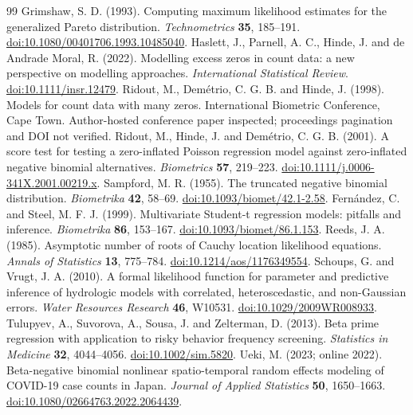 \documentclass[12pt]{article}
\theoremstyle{definition}
\theoremstyle{remark}
\begin{document}
\begin{thebibliography}{99}
 Grimshaw, S. D. (1993). Computing maximum likelihood estimates for the generalized Pareto distribution. \textit{Technometrics} \textbf{35}, 185--191. \href{https://doi.org/10.1080/00401706.1993.10485040}{doi:10.1080/00401706.1993.10485040}.
 Haslett, J., Parnell, A. C., Hinde, J. and de Andrade Moral, R. (2022). Modelling excess zeros in count data: a new perspective on modelling approaches. \textit{International Statistical Review}. \href{https://doi.org/10.1111/insr.12479}{doi:10.1111/insr.12479}.
 Ridout, M., Dem\'etrio, C. G. B. and Hinde, J. (1998). Models for count data with many zeros. International Biometric Conference, Cape Town. Author-hosted conference paper inspected; proceedings pagination and DOI not verified.
 Ridout, M., Hinde, J. and Dem\'etrio, C. G. B. (2001). A score test for testing a zero-inflated Poisson regression model against zero-inflated negative binomial alternatives. \textit{Biometrics} \textbf{57}, 219--223. \href{https://doi.org/10.1111/j.0006-341X.2001.00219.x}{doi:10.1111/j.0006-341X.2001.00219.x}.
 Sampford, M. R. (1955). The truncated negative binomial distribution. \textit{Biometrika} \textbf{42}, 58--69. \href{https://doi.org/10.1093/biomet/42.1-2.58}{doi:10.1093/biomet/42.1-2.58}.
 Fern\'andez, C. and Steel, M. F. J. (1999). Multivariate Student-t regression models: pitfalls and inference. \textit{Biometrika} \textbf{86}, 153--167. \href{https://doi.org/10.1093/biomet/86.1.153}{doi:10.1093/biomet/86.1.153}.
 Reeds, J. A. (1985). Asymptotic number of roots of Cauchy location likelihood equations. \textit{Annals of Statistics} \textbf{13}, 775--784. \href{https://doi.org/10.1214/aos/1176349554}{doi:10.1214/aos/1176349554}.
 Schoups, G. and Vrugt, J. A. (2010). A formal likelihood function for parameter and predictive inference of hydrologic models with correlated, heteroscedastic, and non-Gaussian errors. \textit{Water Resources Research} \textbf{46}, W10531. \href{https://doi.org/10.1029/2009WR008933}{doi:10.1029/2009WR008933}.
 Tulupyev, A., Suvorova, A., Sousa, J. and Zelterman, D. (2013). Beta prime regression with application to risky behavior frequency screening. \textit{Statistics in Medicine} \textbf{32}, 4044--4056. \href{https://doi.org/10.1002/sim.5820}{doi:10.1002/sim.5820}.
 Ueki, M. (2023; online 2022). Beta-negative binomial nonlinear spatio-temporal random effects modeling of COVID-19 case counts in Japan. \textit{Journal of Applied Statistics} \textbf{50}, 1650--1663. \href{https://doi.org/10.1080/02664763.2022.2064439}{doi:10.1080/02664763.2022.2064439}.

\end{thebibliography}
\end{document}
